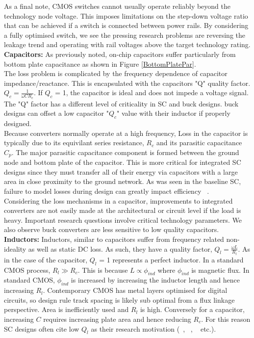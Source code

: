 \documentclass[letterpaper,twocolumn,10pt]{article}
\begin{document}
\indent As a final note, CMOS switches cannot usually operate reliably beyond the technology node voltage. This imposes limitations on the step-down voltage ratio that can be achieved if a switch is connected between power rails. %
\indent By considering a fully optimised switch, we see the pressing research problems are reversing the leakage trend\cite{Iwai2009} and operating with rail voltages above the target technology rating.\\ 
\textbf{Capacitors: }
As previously noted, on-chip capacitors suffer particularly from bottom plate capacitance as shown in Figure \ref{BottomPlatePar}.\\
The loss problem is complicated by the frequency dependence of capacitor impedance/reactance. This is encapsulated with the capacitors "Q" quality factor. $Q_c=\frac{1}{\omega CR_c}$. If $Q_c$ = 1, the capacitor is ideal and does not impede a voltage signal. The "Q" factor has a different level of criticality in SC and buck designs. buck designs can offset a low capacitor "$Q_c$" value with their inductor if properly designed.\\
Because converters normally operate at a high frequency, Loss in the capacitor is typically due to its equivilant series resistance, $R_c$ and its parasitic capacitance $C_p$. The major parasitic capacitance component is formed between the ground node and bottom plate of the capacitor\cite{Damak2013}. This is more critical for integrated SC designs since they must transfer all of their energy via capacitors with a large area in close proximity to the ground network. As was seen in the baseline SC, failure to model losses during design can greatly impact efficiency ~\cite{Viraj2007}.\\
\indent Considering the loss mechanisms in a capacitor, improvements to integrated converters are not easily made at the architectural or circuit level if the load is heavy. Important research questions involve critical technology parameters. We also observe buck converters are less sensitive to low quality capacitors.\\
\textbf{Inductors: }Inductors, similar to capacitors suffer from frequency related non-ideality as well as static DC loss. As such, they have a quality factor, $Q_l = \frac{\omega L}{R_l}$. As in the case of the capacitor, $Q_l$ = 1 represents a perfect inductor. In a standard CMOS process, $R_l \gg R_c$. This is because $L \propto \phi_{ind}$ where $\phi_{ind}$ is magnetic flux. In standard CMOS, $\phi_{ind}$ is increased by increasing the inductor length and hence increasing $R_l$. Contemporary CMOS has metal layers optimised for digital circuits, so design rule track spacing is likely sub optimal from a flux linkage perspective. Area is inefficiently used and $R_l$ is high. Conversely for a capacitor, increasing $C$ requires increasing plate area and hence reducing $R_c$. For this reason SC designs often cite low $Q_l$ as their research motivation (~\cite{Pique2012}, ~\cite{Yogesh2010}, ~\cite{PhuckLe2011} etc.).\\
\end{document}
